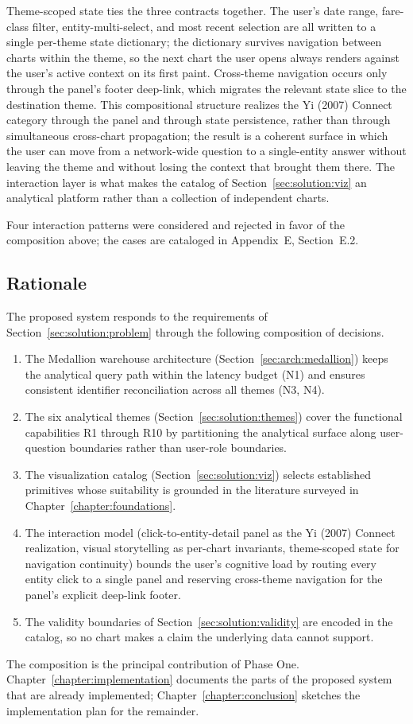 Theme-scoped state ties the three contracts together. The user's date
range, fare-class filter, entity-multi-select, and most recent
selection are all written to a single per-theme state dictionary; the
dictionary survives navigation between charts within the theme, so the
next chart the user opens always renders against the user's active
context on its first paint. Cross-theme navigation occurs only through
the panel's footer deep-link, which migrates the relevant state slice
to the destination theme. This compositional structure realizes the
Yi (2007) Connect category through the panel and through state
persistence, rather than through simultaneous cross-chart propagation;
the result is a coherent surface in which the user can move from a
network-wide question to a single-entity answer without leaving the
theme and without losing the context that brought them there. The
interaction layer is what makes the catalog of
Section~\ref{sec:solution:viz} an analytical platform rather than a
collection of independent charts.

Four interaction patterns were considered and rejected in favor of the composition above; the cases are cataloged in Appendix~E, Section~E.2.

\subsection{Rationale}
\label{sec:solution:summary}

The proposed system responds to the requirements of Section~\ref{sec:solution:problem} through the following composition of decisions.

\begin{enumerate}
\item The Medallion warehouse architecture (Section~\ref{sec:arch:medallion}) keeps the analytical query path within the latency budget (N1) and ensures consistent identifier reconciliation across all themes (N3, N4).
\item The six analytical themes (Section~\ref{sec:solution:themes}) cover the functional capabilities R1 through R10 by partitioning the analytical surface along user-question boundaries rather than user-role boundaries.
\item The visualization catalog (Section~\ref{sec:solution:viz}) selects established primitives whose suitability is grounded in the literature surveyed in Chapter~\ref{chapter:foundations}.
\item The interaction model (click-to-entity-detail panel as the Yi (2007) Connect realization, visual storytelling as per-chart invariants, theme-scoped state for navigation continuity) bounds the user's cognitive load by routing every entity click to a single panel and reserving cross-theme navigation for the panel's explicit deep-link footer.
\item The validity boundaries of Section~\ref{sec:solution:validity} are encoded in the catalog, so no chart makes a claim the underlying data cannot support.
\end{enumerate}

The composition is the principal contribution of Phase One. Chapter~\ref{chapter:implementation} documents the parts of the proposed system that are already implemented; Chapter~\ref{chapter:conclusion} sketches the implementation plan for the remainder.
